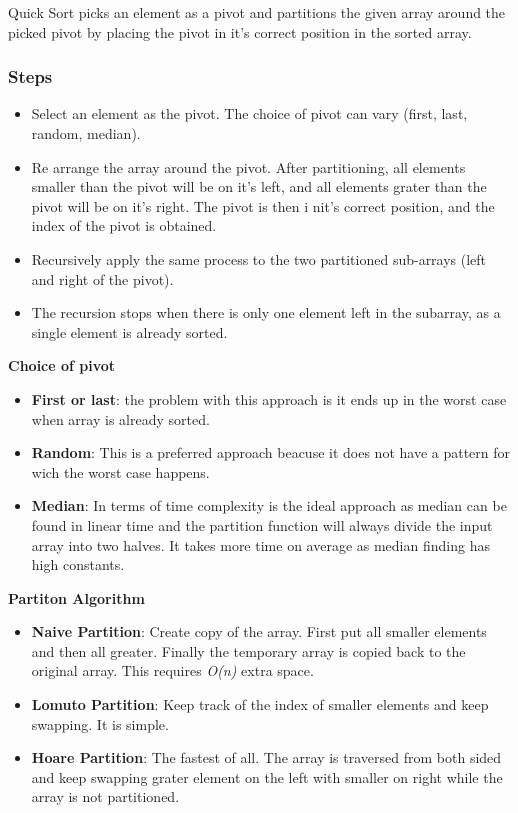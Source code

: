 Quick Sort picks an element as a pivot and partitions the given array around the picked pivot by placing the pivot in it's correct position in the sorted array.

\subsubsection*{Steps}

\begin{itemize}
  \item Select an element as the pivot. The choice of pivot can vary (first, last, random, median).
  \item Re arrange the array around the pivot. After partitioning, all elements smaller than the pivot will be on it's left, and all elements grater than the pivot will be on it's right. The pivot is then i nit's correct position, and the index of the pivot is obtained.
  \item Recursively apply the same process to the two partitioned sub-arrays (left and right of the pivot).
  \item The recursion stops when there is only one element left in the subarray, as a single element is already sorted.
\end{itemize}

\textbf{Choice of pivot}

\begin{itemize}
  \item \textbf{First or last}: the problem with this approach is it ends up in the worst case when array is already sorted.
  \item \textbf{Random}: This is a preferred approach beacuse it does not have a pattern for wich the worst case happens.
  \item \textbf{Median}: In terms of time complexity is the ideal approach as median can be found in linear time and the partition function will always divide the input array into two halves. It takes more time on average as median finding has high constants.
\end{itemize}

\textbf{Partiton Algorithm}

\begin{itemize}
  \item \textbf{Naive Partition}: Create copy of the array. First put all smaller elements and then all greater. Finally the temporary array is copied back to the original array. This requires \textit{O(n)} extra space.
  \item \textbf{Lomuto Partition}: Keep track of the index of smaller elements and keep swapping. It is simple.
  \item \textbf{Hoare Partition}: The fastest of all. The array is traversed from both sided and keep swapping grater element on the left with smaller on right while the array is not partitioned.
\end{itemize}

